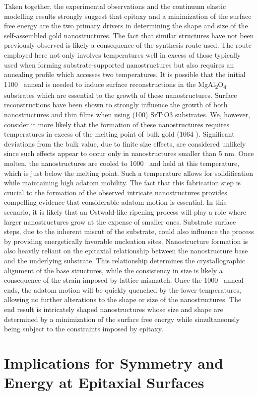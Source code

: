 Taken together, the experimental observations and the
continuum elastic modelling results strongly suggest that
epitaxy and a minimization of the surface free energy are
the two primary drivers in determining the shape and size
of the self-assembled gold nanostructures. The fact that
similar structures have not been previously observed is likely
a consequence of the synthesis route used. The route employed here not only involves temperatures well in excess
of those typically used when forming substrate-supported
nanostructures but also requires an annealing profile which
accesses two temperatures. It is possible that the initial 1100 \celsius~anneal is needed to induce surface reconstructions in the
MgAl\textsubscript{2}O\textsubscript{4} substrates which are essential to the growth of these
nanostructures. Surface reconstructions have been shown to
strongly influence the growth of both nanostructures\cite{RefWorks:24,RefWorks:16,RefWorks:104}
and thin films\cite{Neretina2009a} when using (100) SrTiO3 substrates. We,
however, consider it more likely that the formation of these
nanostructures requires temperatures in excess of the melting
point of bulk gold (1064 \celsius). Significant deviations from
the bulk value, due to finite size effects, are considered
unlikely since such effects appear to occur only in nanostructures smaller than 5 nm\cite{RefWorks:43}. Once molten, the nanostructures are cooled to 1000 \celsius~and held at this temperature,
which is just below the melting point. Such a temperature
allows for solidification while maintaining high adatom
mobility. The fact that this fabrication step is crucial to the
formation of the observed intricate nanostructures provides
compelling evidence that considerable adatom motion is
essential. In this scenario, it is likely that an Ostwald-like
ripening process will play a role where larger nanostructures
grow at the expense of smaller ones. Substrate surface steps,
due to the inherent miscut of the substrate\cite{RefWorks:69}, could also
influence the process by providing energetically favorable
nucleation sites. Nanostructure formation is also heavily
reliant on the epitaxial relationship between the nanostructure
base and the underlying substrate. This relationship determines the crystallographic alignment of the base structures,
while the consistency in size is likely a consequence of the
strain imposed by lattice mismatch. Once the 1000 \celsius~anneal
ends, the adatom motion will be quickly quenched by the
lower temperatures, allowing no further alterations to the
shape or size of the nanostructures. The end result is
intricately shaped nanostructures whose size and shape are
determined by a minimization of the surface free energy
while simultaneously being subject to the constraints imposed
by epitaxy.

\section{Implications for Symmetry and Energy at Epitaxial Surfaces}
